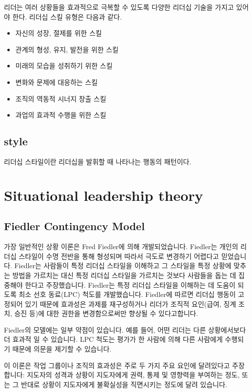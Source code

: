 리더는 여러 상황들을 효과적으로 극복할 수 있도록 다양한 리더십 기술을 가지고 있어야 한다.
리더십 스킬 유형은 다음과 같다.
\begin{itemize}
  \item 자신의 성장, 절제를 위한 스킬
  \item 관계의 형성, 유지, 발전을 위한 스킬
  \item 미래의 모습을 성취하기 위한 스킬
  \item 변화와 문제에 대응하는 스킬
  \item 조직의 역동적 시너지 창출 스킬
  \item 과업의 효과적 수행을 위한 스킬
\end{itemize}

\subsection*{style}

리더십 스타일이란 리더십을 발휘할 때 나타나는 행동의 패턴이다.

\newpage
\section{Situational leadership theory}

\subsection*{Fiedler Contingency Model}
가장 일반적인 상황 이론은 Fred Fiedler에 의해 개발되었습니다. Fiedler는 개인의
리더십 스타일이 수명 전반을 통해 형성되며 따라서 극도로 변경하기 어렵다고
믿었습니다. Fiedler는 사람들이 특정 리더십 스타일을 이해하고 그 스타일을 특정
상황에 맞추는 방법을 가르치는 대신 특정 리더십 스타일을 가르치는 것보다 사람들을
돕는 데 집중해야 한다고 주장했습니다. Fiedler는 특정 리더십 스타일을 이해하는 데
도움이 되도록 최소 선호 동료(LPC) 척도를 개발했습니다. Fiedler에 따르면 리더십
행동이 고정되어 있기 때문에 효과성은 과제를 재구성하거나 리더가 조직적
요인(급여, 징계 조치, 승진 등)에 대한 권한을 변경함으로써만 향상될 수
있다고합니다.

Fiedler의 모델에는 일부 약점이 있습니다. 예를 들어, 어떤 리더는 다른
상황에서보다 더 효과적 일 수 있습니다. LPC 척도는 평가가 한 사람에 의해 다른
사람에게 수행되기 때문에 의문을 제기할 수 있습니다.

이 이론은 작업 그룹이나 조직의 효과성은 주로 두 가지 주요 요인에 달려있다고
주장합니다: 지도자의 성격과 상황이 지도자에게 권력, 통제 및 영향력을 부여하는
정도, 또는 그 반대로 상황이 지도자에게 불확실성을 직면시키는 정도에 달려
있습니다.

